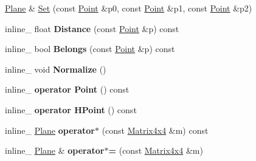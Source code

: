 \begin{DoxyCompactItemize}
\item 
\hyperlink{class_plane}{Plane} \& \hyperlink{class_plane_a5a2f7f130ff82cbb0ef491951aed6ff4}{Set} (const \hyperlink{class_point}{Point} \&p0, const \hyperlink{class_point}{Point} \&p1, const \hyperlink{class_point}{Point} \&p2)
\item 
\hypertarget{class_plane_a8c9d643fb2860cd29c98473f429d0e02}{inline\+\_\+ float {\bfseries Distance} (const \hyperlink{class_point}{Point} \&p) const }\label{class_plane_a8c9d643fb2860cd29c98473f429d0e02}

\item 
\hypertarget{class_plane_aeaa0a198a1a512310608958a63d7b105}{inline\+\_\+ bool {\bfseries Belongs} (const \hyperlink{class_point}{Point} \&p) const }\label{class_plane_aeaa0a198a1a512310608958a63d7b105}

\item 
\hypertarget{class_plane_a9cf8ba6c1d6abb3f1d045d3ad992118a}{inline\+\_\+ void {\bfseries Normalize} ()}\label{class_plane_a9cf8ba6c1d6abb3f1d045d3ad992118a}

\item 
\hypertarget{class_plane_af3990735befb0f7baea5e4eef6a08bf6}{inline\+\_\+ {\bfseries operator Point} () const }\label{class_plane_af3990735befb0f7baea5e4eef6a08bf6}

\item 
\hypertarget{class_plane_ae539171c0c9f44f35570d8c555ca41b5}{inline\+\_\+ {\bfseries operator H\+Point} () const }\label{class_plane_ae539171c0c9f44f35570d8c555ca41b5}

\item 
\hypertarget{class_plane_a4dd7d7d75595a796172c4fd126e97074}{inline\+\_\+ \hyperlink{class_plane}{Plane} {\bfseries operator$\ast$} (const \hyperlink{class_matrix4x4}{Matrix4x4} \&m) const }\label{class_plane_a4dd7d7d75595a796172c4fd126e97074}

\item 
\hypertarget{class_plane_a25050a542461594859a0b368a80e0af3}{inline\+\_\+ \hyperlink{class_plane}{Plane} \& {\bfseries operator$\ast$=} (const \hyperlink{class_matrix4x4}{Matrix4x4} \&m)}\label{class_plane_a25050a542461594859a0b368a80e0af3}

\end{DoxyCompactItemize}

